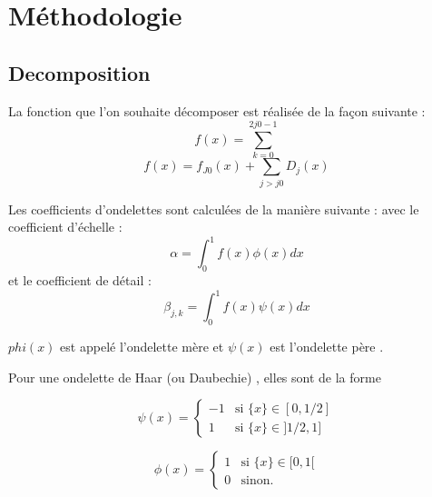 \section{Méthodologie}

\subsection{Decomposition}
La fonction que l'on souhaite décomposer est réalisée de la façon suivante :
\begin{equation}
f(x)= \sum^{2j0-1}_{k=0} 
\end{equation}
\begin{equation}
f(x) =f_{J0}(x) +\sum_{j>j0} D_{j}(x)
\end{equation}

Les coefficients d'ondelettes sont calculées de la manière suivante :
avec le coefficient d'échelle :
\begin{equation}
\alpha = \int^{1}_{0}f(x)\phi(x)dx
\end{equation}
et le coefficient de détail :
\begin{equation}
\beta_{j,k} = \int^{1}_{0}f(x)\psi(x)dx
\end{equation}

$phi(x)$ est appelé l'ondelette mère
et $\psi(x) $ est l'ondelette père .

Pour une ondelette de Haar (ou Daubechie) , elles sont de la forme 



\begin{equation}
\psi(x) = \left\{
    \begin{array}{ll}
        -1 & \mbox{si } \{x\} \in [0,1/2] \\
        1 & \mbox{si } \{x\} \in ]1/2,1]
    \end{array}
\right.
\end{equation}


\begin{equation}
\phi(x) = \left\{
    \begin{array}{ll}
        1 & \mbox{si } \{x\} \in [0,1[ \\
        0 & \mbox{sinon.} 
     \end{array}
\right.
\end{equation}



\paragraph{}
